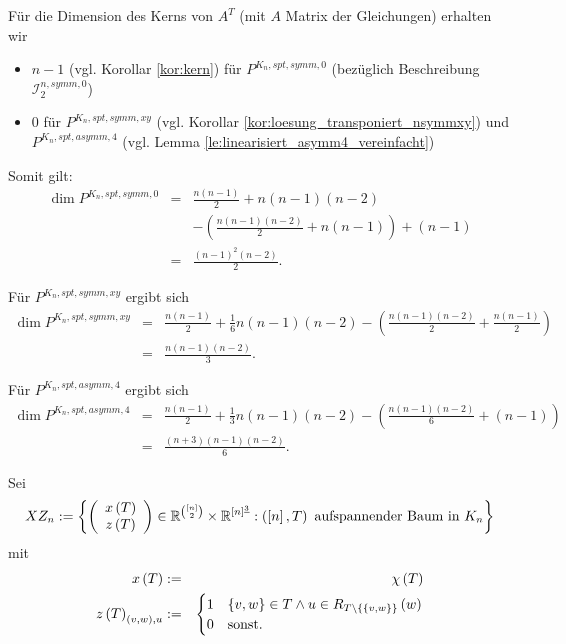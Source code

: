\documentclass[10p,a4paper,BCOR = 12mm, DIV=15]{scrbook}
\begin{document}
\begin{bew}
Für die Dimension des Kerns von $A^T$ (mit $A$ Matrix der Gleichungen) erhalten wir
\begin{itemize}
\item $n-1$ (vgl. Korollar \ref{kor:kern}) für $P^{K_n, spt, symm, 0}$ (bezüglich Beschreibung $\mathcal{I}^{n, symm, 0}_2$)
\item $0$ für $P^{K_n, spt, symm, xy}$ (vgl. Korollar \ref{kor:loesung_transponiert_nsymmxy}) und $P^{K_n, spt, asymm, 4}$ (vgl. Lemma \ref{le:linearisiert_asymm4_vereinfacht})
\end{itemize}

Somit gilt: 
\begin{eqnarray*}
\dim P^{K_n, spt, symm, 0} & = & \frac{n \left(n-1\right)}{2}+n \left(n-1\right)(n-2) \\
& & -\left(\frac{n \left(n-1\right)\left(n-2\right)}{2}+n \left(n-1\right)\right)+\left(n-1\right) \\
& = & \frac{\left(n-1\right)^2 \left(n-2\right)}{2}.
\end{eqnarray*}

Für $P^{K_n, spt, symm, xy}$ ergibt sich
\begin{eqnarray*}
\dim P^{K_n, spt, symm, xy} & = & \frac{n \left(n-1\right)}{2}+\frac{1}{6} n \left(n-1\right)(n-2) -\left(\frac{n \left(n-1\right)\left(n-2\right)}{2}+\frac{n \left(n-1\right)}{2}\right) \\
& = & \frac{n \left(n-1\right)\left(n-2\right)}{3}.
\end{eqnarray*}

Für $P^{K_n, spt, asymm, 4}$ ergibt sich
\begin{eqnarray*}
\dim P^{K_n, spt, asymm, 4} & = & \frac{n \left(n-1\right)}{2}+\frac{1}{3} n \left(n-1\right)(n-2)  -\left(\frac{n \left(n-1\right)\left(n-2\right)}{6}+\left(n-1\right)\right) \\
& = & \frac{\left(n+3\right)\left(n-1\right)\left(n-2\right)}{6}.
\end{eqnarray*}
\end{bew}

\begin{Def}
\label{def:xz_n}
Sei
\begin{displaymath}
XZ_n := \left\{ \left(\begin{array}{c}
x\left(T\right) \\
z\left(T\right)
\end{array}\right)\in\mathbb{R}^{[n]\choose 2}\times \mathbb{R}^{[n]^{\underline{3}}}: 
\left(\left[n\right], T\right)\textnormal{ aufspannender Baum in }K_n
\right\}
\end{displaymath}
mit
\begin{eqnarray*}
x\left(T\right) & := & \chi\left(T\right) \\
z\left(T\right)_{\left(v, w\right), u} & := & \begin{cases}
1 & \left\{v, w\right\}\in T\wedge u\in R_{T\backslash \left\{\left\{v, w\right\}\right\}}\left(w\right)\\
0 & \textnormal{sonst.}
\end{cases}
\end{eqnarray*}
\end{Def}
\end{document}
